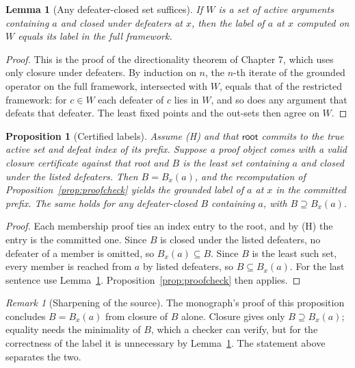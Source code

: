 \documentclass[11pt]{article}
\theoremstyle{plain}
\newtheorem{proposition}[theorem]{Proposition}
\newtheorem{lemma}[theorem]{Lemma}
\theoremstyle{definition}
\theoremstyle{remark}
\newtheorem{remark}[theorem]{Remark}
\begin{document}
\begin{lemma}[Any defeater-closed set suffices]\label{lem:closed}
If $W$ is a set of active arguments containing $a$ and closed under defeaters at $x$, then the label of $a$ at $x$ computed on $W$ equals its label in the full framework.
\end{lemma}

\begin{proof}
This is the proof of the directionality theorem of Chapter 7, which uses only closure under defeaters. By induction on $n$, the $n$-th iterate of the grounded operator on the full framework, intersected with $W$, equals that of the restricted framework: for $c\in W$ each defeater of $c$ lies in $W$, and so does any argument that defeats that defeater. The least fixed points and the out-sets then agree on $W$.
\end{proof}

\begin{proposition}[Certified labels]\label{prop:certified}
Assume (H) and that $\mathsf{root}$ commits to the true active set and defeat index of its prefix. Suppose a proof object comes with a valid closure certificate against that root and $B$ is the least set containing $a$ and closed under the listed defeaters. Then $B=B_x(a)$, and the recomputation of Proposition~\ref{prop:proofcheck} yields the grounded label of $a$ at $x$ in the committed prefix. The same holds for any defeater-closed $B$ containing $a$, with $B\supseteq B_x(a)$.
\end{proposition}

\begin{proof}
Each membership proof ties an index entry to the root, and by (H) the entry is the committed one. Since $B$ is closed under the listed defeaters, no defeater of a member is omitted, so $B_x(a)\subseteq B$. Since $B$ is the least such set, every member is reached from $a$ by listed defeaters, so $B\subseteq B_x(a)$. For the last sentence use Lemma~\ref{lem:closed}. Proposition~\ref{prop:proofcheck} then applies.
\end{proof}

\begin{remark}[Sharpening of the source]
The monograph's proof of this proposition concludes $B=B_x(a)$ from closure of $B$ alone. Closure gives only $B\supseteq B_x(a)$; equality needs the minimality of $B$, which a checker can verify, but for the correctness of the label it is unnecessary by Lemma~\ref{lem:closed}. The statement above separates the two.
\end{remark}
\end{document}

